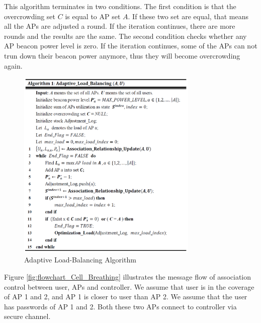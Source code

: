 This algorithm terminates in two conditions. The first condition is that the overcrowding set $C$ is equal to AP set $A$. If these two set are equal, that means all the APs are adjusted a round. If the iteration continues, there are more rounds and the results are the same. The second condition checks whether any AP beacon power level is zero. If the iteration continues, some of the APs can not trun down their beacon power anymore, thus they will become overcrowding again.

\begin{figure}[tbp]
\centering
\includegraphics[width=3.4in]{images/algorithm.png}
\caption{Adaptive Load-Balancing Algorithm}
\label{fig:algorithm}
\end{figure}

Figure \ref{fig:flowchart_Cell_Breathing} illustrates the message flow of association control between user, APs and controller. We assume that user is in the coverage of AP 1 and 2, and AP 1 is closer to user than AP 2. We assume that the user has passwords of AP 1 and 2. Both these two APs connect to controller via secure channel.

